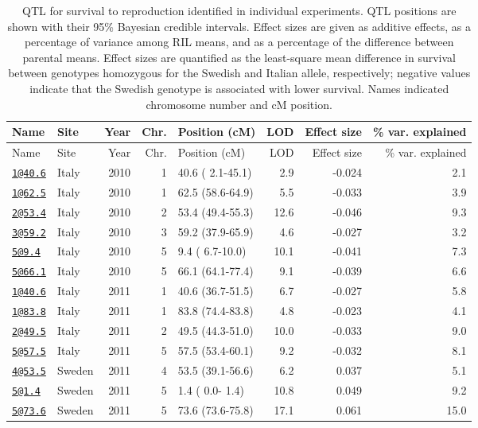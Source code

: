 \documentclass[]{article}
\begin{document}
\begin{longtable}[]{@{}llrrlrrr@{}}
\caption{\label{tab:individual-surv-qtl}QTL for survival to reproduction identified in individual experiments. QTL positions are shown with their 95\% Bayesian credible intervals. Effect sizes are given as additive effects, as a percentage of variance among RIL means, and as a percentage of the difference between parental means. Effect sizes are quantified as the least-square mean difference in survival between genotypes homozygous for the Swedish and Italian allele, respectively; negative values indicate that the Swedish genotype is associated with lower survival. Names indicated chromosome number and cM position.}\tabularnewline
\toprule
Name & Site & Year & Chr. & Position (cM) & LOD & Effect size & \% var. explained\tabularnewline
\midrule
\endfirsthead
\toprule
Name & Site & Year & Chr. & Position (cM) & LOD & Effect size & \% var. explained\tabularnewline
\midrule
\endhead
\href{mailto:1@40.6}{\nolinkurl{1@40.6}} & Italy & 2010 & 1 & 40.6 ( 2.1-45.1) & 2.9 & -0.024 & 2.1\tabularnewline
\href{mailto:1@62.5}{\nolinkurl{1@62.5}} & Italy & 2010 & 1 & 62.5 (58.6-64.9) & 5.5 & -0.033 & 3.9\tabularnewline
\href{mailto:2@53.4}{\nolinkurl{2@53.4}} & Italy & 2010 & 2 & 53.4 (49.4-55.3) & 12.6 & -0.046 & 9.3\tabularnewline
\href{mailto:3@59.2}{\nolinkurl{3@59.2}} & Italy & 2010 & 3 & 59.2 (37.9-65.9) & 4.6 & -0.027 & 3.2\tabularnewline
\href{mailto:5@9.4}{\nolinkurl{5@9.4}} & Italy & 2010 & 5 & 9.4 ( 6.7-10.0) & 10.1 & -0.041 & 7.3\tabularnewline
\href{mailto:5@66.1}{\nolinkurl{5@66.1}} & Italy & 2010 & 5 & 66.1 (64.1-77.4) & 9.1 & -0.039 & 6.6\tabularnewline
\href{mailto:1@40.6}{\nolinkurl{1@40.6}} & Italy & 2011 & 1 & 40.6 (36.7-51.5) & 6.7 & -0.027 & 5.8\tabularnewline
\href{mailto:1@83.8}{\nolinkurl{1@83.8}} & Italy & 2011 & 1 & 83.8 (74.4-83.8) & 4.8 & -0.023 & 4.1\tabularnewline
\href{mailto:2@49.5}{\nolinkurl{2@49.5}} & Italy & 2011 & 2 & 49.5 (44.3-51.0) & 10.0 & -0.033 & 9.0\tabularnewline
\href{mailto:5@57.5}{\nolinkurl{5@57.5}} & Italy & 2011 & 5 & 57.5 (53.4-60.1) & 9.2 & -0.032 & 8.1\tabularnewline
\href{mailto:4@53.5}{\nolinkurl{4@53.5}} & Sweden & 2011 & 4 & 53.5 (39.1-56.6) & 6.2 & 0.037 & 5.1\tabularnewline
\href{mailto:5@1.4}{\nolinkurl{5@1.4}} & Sweden & 2011 & 5 & 1.4 ( 0.0- 1.4) & 10.8 & 0.049 & 9.2\tabularnewline
\href{mailto:5@73.6}{\nolinkurl{5@73.6}} & Sweden & 2011 & 5 & 73.6 (73.6-75.8) & 17.1 & 0.061 & 15.0\tabularnewline
\bottomrule
\end{longtable}

\newpage
\end{document}
